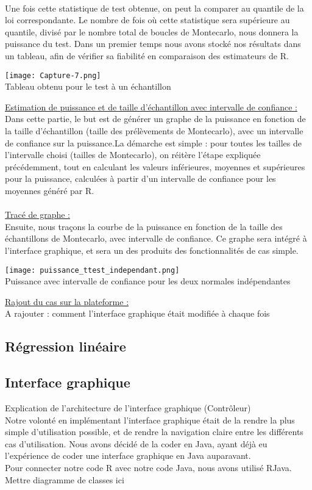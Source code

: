 \documentclass[a4paper,11pt]{article}
\begin{document}
\\ Une fois cette statistique de test obtenue, on peut la comparer au quantile de la loi correspondante. Le nombre de fois où cette statistique sera supérieure au quantile, divisé par le nombre total de boucles de Montecarlo, nous donnera la puissance du test. Dans un premier temps nous avons stocké nos résultats dans un tableau, afin de vérifier sa fiabilité en comparaison des estimateurs de R.\\
\begin{center}
\texttt{[image: Capture-7.png]}\\
Tableau obtenu pour le test à un échantillon 
\\[1 cm]
\end{center}
\underline{Estimation de puissance et de taille d'échantillon avec intervalle de confiance :}\\
Dans cette partie, le but est de générer un graphe de la puissance en fonction de la taille d'échantillon (taille des prélèvements de Montecarlo), avec un intervalle de confiance sur la puissance.La démarche est simple : pour toutes les tailles de l'intervalle choisi (tailles de Montecarlo), on réitère l'étape expliquée précédemment, tout en calculant les valeurs inférieures, moyennes et supérieures pour la puissance, calculées à partir d'un intervalle de confiance pour les moyennes généré par R.\\ \\


\underline{Tracé de graphe :}\\
Ensuite, nous traçons la courbe de la puissance en fonction de la taille des échantillons de Montecarlo, avec intervalle de confiance. Ce graphe sera intégré à l'interface graphique, et sera un des produits des fonctionnalités de cas simple.
\begin{center}
\texttt{[image: puissance\_ttest\_independant.png]}\\
Puissance avec intervalle de confiance pour les deux normales indépendantes
\end{center}
\underline{Rajout du cas sur la plateforme :}\\
A rajouter : comment l'interface graphique était modifiée à chaque fois

\subsection{Régression linéaire}

\subsection{Interface graphique}
Explication de l'architecture de l'interface graphique (Contrôleur)\\
Notre volonté en implémentant l'interface graphique était de la rendre la plus simple d'utilisation possible, et de rendre la navigation claire entre les différents cas d'utilisation. Nous avons décidé de la coder en Java, ayant déjà eu l'expérience de coder une interface graphique en Java auparavant.\\
Pour connecter notre code R avec notre code Java, nous avons utilisé RJava.
\\Mettre diagramme de classes ici
\end{document}
